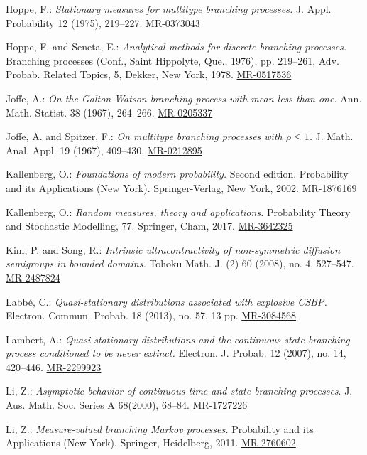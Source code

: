 \documentclass[12pt,a4paper]{amsart}
\numberwithin{equation}{section}
\theoremstyle{plain}
\theoremstyle{definition}
\theoremstyle{remark}
\def\MR#1{\href{http://www.ams.org/mathscinet-getitem?mr=#1}{MR-#1}}
\begin{document}
\begin{thebibliography}{99}
	
	Hoppe, F.:
	\emph{Stationary measures for multitype branching processes.}
	J. Appl. Probability 12 (1975), 219--227.
	\MR{0373043}
	
	Hoppe, F. and Seneta, E.:
	\emph{Analytical methods for discrete branching processes.}
	Branching processes (Conf., Saint Hippolyte, Que., 1976), pp. 219--261,
	Adv. Probab. Related Topics, 5, Dekker, New York, 1978.
	\MR{0517536}
	
	Joffe, A.:
	\emph{On the Galton-Watson branching process with mean less than one.}
	Ann. Math. Statist. 38 (1967), 264--266.
	\MR{0205337}
	
	Joffe, A. and Spitzer, F.:
	\emph{On multitype branching processes with $\rho \leq 1$.}
	J. Math. Anal. Appl. 19 (1967), 409--430.
	\MR{0212895}
	
	Kallenberg, O.:
	\emph{Foundations of modern probability.}
	Second edition. Probability and its Applications (New York). Springer-Verlag, New York, 2002.
	\MR{1876169}
	
	Kallenberg, O.:
	\emph{Random measures, theory and applications.}
	Probability Theory and Stochastic Modelling, 77. Springer, Cham, 2017.
	\MR{3642325}
	
	Kim, P. and Song, R.:
	\emph{Intrinsic ultracontractivity of non-symmetric diffusion semigroups in bounded domains.}
	Tohoku Math. J. (2) 60 (2008), no. 4, 527--547.
	\MR{2487824}
	
	Labb\'e, C.:
	\emph{Quasi-stationary distributions associated with explosive CSBP.}
	Electron. Commun. Probab. 18 (2013), no. 57, 13 pp.
	\MR{3084568}
	
	Lambert, A.:
	\emph{Quasi-stationary distributions and the continuous-state branching process conditioned to be never extinct.}
	Electron. J. Probab. 12 (2007), no. 14, 420--446.
	\MR{2299923}

	 Li, Z.:
	\emph{Asymptotic behavior of continuous time and state branching processes}.
	J. Aus. Math. Soc. Series A 68(2000), 68--84.
	\MR{1727226}

	Li, Z.:
	\emph{Measure-valued branching Markov processes.}
	Probability and its Applications (New York). Springer, Heidelberg, 2011.
	\MR{2760602}
	

\end{thebibliography}
\end{document}
